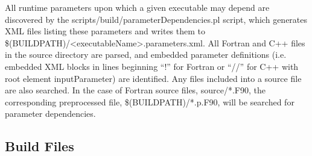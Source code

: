 All runtime parameters upon which a given executable may depend are discovered by the {\normalfont \ttfamily scripts/build/parameterDependencies.pl} script, which generates XML files listing these parameters and writes them to {\normalfont \ttfamily \$(BUILDPATH)/\textless executableName\textgreater.parameters.xml}. All Fortran and C++ files in the {\normalfont \ttfamily source} directory are parsed, and embedded parameter definitions (i.e. embedded XML blocks in lines beginning ``!\@'' for Fortran or ``//\@'' for C++ with root element {\normalfont \ttfamily inputParameter}) are identified. Any files included into a source file are also searched. In the case of Fortran source files, {\normalfont \ttfamily source/*.F90}, the corresponding preprocessed file, {\normalfont \ttfamily \$(BUILDPATH)/*.p.F90}, will be searched for parameter dependencies.

\subsection{Build Files}

